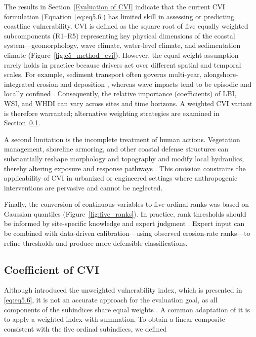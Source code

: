 The results in Section~\ref{Evaluation of CVI} indicate that the current CVI
formulation (Equation~\ref{eq:eq5.6}) has limited skill in assessing or
predicting coastline vulnerability. CVI is defined as the square root of five
equally weighted subcomponents (R1–R5) representing key physical dimensions of
the coastal system—geomorphology, wave climate, water-level climate, and
sedimentation climate (Figure~\ref{fig:c5_method_cvi}). However, the
equal-weight assumption rarely holds in practice because drivers act over
different spatial and temporal scales. For example, sediment transport often
governs multi-year, alongshore-integrated erosion and deposition
\citep[e.g.,][]{davidson-arnott_wave_1980,chowdhury_effect_2017,penrod2023multidecadal,kabuth_wave_2014,hapke_review_2010},
whereas wave impacts tend to be episodic and locally confined
\citep{swenson_bluff_2006}. Consequently, the relative importance (coefficients)
of LBI, WSI, and WHDI can vary across sites and time horizons. A weighted CVI
variant is therefore warranted; alternative weighting strategies are examined in
Section~\ref{Coefficient of CVI}.

A second limitation is the incomplete treatment of human actions. Vegetation
management, shoreline armoring, and other coastal defense structures can
substantially reshape morphology and topography and modify local hydraulics,
thereby altering exposure and response pathways
\citep{nordstrom2014living,jackson2015beach,sanitwong2023environmental}. This
omission constrains the applicability of CVI in urbanized or engineered settings
where anthropogenic interventions are pervasive and cannot be neglected.

Finally, the conversion of continuous variables to five ordinal ranks was based
on Gaussian quantiles (Figure~\ref{fig:five_ranks}). In practice, rank
thresholds should be informed by site-specific knowledge and expert judgment
\citep[e.g.,][]{fu2022characteristics,gornitz_global_1991,anfuso_coastal_2021}.
Expert input can be combined with data-driven calibration—using observed
erosion-rate ranks—to refine thresholds and produce more defensible
classifications.

\subsection{Coefficient of CVI}
\label{Coefficient of CVI}

Although \citet{gornitz_global_1991} introduced the unweighted vulnerability
index, which is presented in \ref{eq:eq5.6}, it is not an accurate approach for
the evaluation goal, as all components of the subindices share equal weights
\citet{fu2022characteristics}. A common adaptation of it is to apply a weighted
index with summation. To obtain a linear composite consistent with the five
ordinal subindices, we defined

